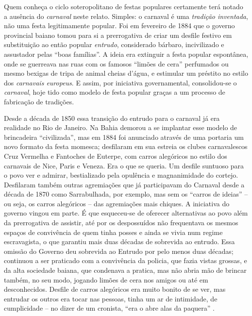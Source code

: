 Quem conheça o ciclo soteropolitano de festas populares certamente terá notado a ausência do \textit{carnaval} neste relato. Simples: o carnaval é uma \textit{tradição inventada}, não uma festa legitimamente popular. Foi em fevereiro de 1884 que o governo provincial baiano tomou para si a prerrogativa de criar um desfile festivo em substituição ao então popular \textit{entrudo}, considerado bárbaro, incivilizado e assustador pelas ``boas famílias''. A ideia era extinguir a festa popular espontânea, onde se guerreava nas ruas com os famosos ``limões de cera'' perfumados ou mesmo bexigas de tripa de animal cheias d'água, e estimular um préstito no estilo dos \textit{carnavais europeus}. E assim, por iniciativa governamental, consolidou-se o \textit{carnaval}, hoje tido como modelo de festa popular graças a um processo de fabricação de tradições.

Desde a década de 1850 essa transição do entrudo para o carnaval já era realidade no Rio de Janeiro. Na Bahia demorou a se implantar esse modelo de brincadeira ``civilizada'', mas em 1884 foi anunciado através de uma portaria um novo formato da festa momesca; desfilaram em sua estreia os clubes carnavalescos Cruz Vermelha e Fantoches de Euterpe, com carros alegóricos no estilo dos carnavais de Nice, Paris e Veneza. Era o que se queria. Um desfile suntuoso para o povo ver e admirar, bestializado pela opulência e magnanimidade do cortejo. Desfilaram também outras agremiações que já participavam do Carnaval desde a década de 1870 como Sarrabulhada, por exemplo, mas sem os ``carros de ideias'' -- ou seja, os carros alegóricos -- das agremiações mais chiques. A iniciativa do governo vingou em parte. É que esqueceu-se de oferecer alternativas ao povo além da prerrogativa de assistir, até por os despossuídos não frequentava os mesmos espaços de convivência de quem tinha posses e ainda se vivia num regime escravagista, o que garantiu mais duas décadas de sobrevida ao entrudo. Essa omissão do Governo deu sobrevida ao Entrudo por pelo menos duas décadas; continuou a ser praticado com a convivência da policia, que fazia vistas grossas, e da alta sociedade baiana, que condenava a pratica, mas não abria mão de brincar também, no seu modo, jogando limões de cera nos amigos ou até em desconhecidos. Desfile de carros alegóricos era muito bonito de se ver, mas entrudar os outros era tocar nas pessoas, tinha um ar de intimidade, de cumplicidade -- no dizer de um cronista, ``era o abre alas da paquera'' \cite{cadena_130carnaval_2017}.

